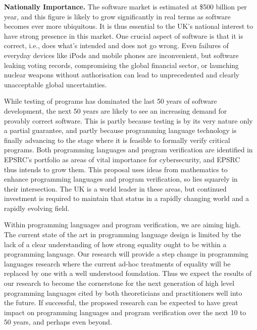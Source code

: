 \documentclass[a4paper,11pt]{article}
\begin{document}
\vspace*{0.02in}

{\bf Nationally Importance.} The software market is estimated at \$500
billion per year, and this figure is likely to grow 
significantly in real terms 
as software becomes ever more
ubiquitous. It is thus essential to the UK's national interest to have 
strong presence in this market. One crucial aspect of software is that
it is correct, i.e., does what's intended and does not go wrong.  Even
failures of everyday devices like iPods and mobile phones are
inconvenient,
but software leaking voting records,
compromising %
the global financial sector, or launching 
nuclear weapons without authorisation 
can lead to unprecedented and clearly unacceptable global uncertainties.

While testing of programs has dominated the last 50 years of software
development,
the next 50 years are likely to see an increasing
demand for provably correct software. This is partly because testing
is by its very nature only a partial guarantee, and partly because
programming language technology is finally advancing to the stage
where it is feasible to formally verify critical programs.
Both programming languages and program verification are identified in
EPSRC's portfolio as areas of vital 
importance for cybersecurity, and EPSRC
thus intends to grow them.
This proposal 
uses ideas from mathematics  to enhance 
programming languages and  program
verification, so lies squarely in their intersection. %
The UK is a world leader
in these areas, but continued investment is required to maintain that
status in a rapidly changing world and a rapidly evolving field.

Within programming languages and program verification, we are aiming
high.  The current state of the art in programming language design is
limited by the lack of a clear understanding of how strong equality
ought to be within a programming language. Our research will provide a
step change in programming languages research where the current
ad-hoc treatments of equality will be replaced by one with a well
understood foundation. Thus we expect the results of our research to
become the cornerstone for the next generation of high level
programming languages cited by both
theoreticians and practitioners well into the future. If successful, 
the proposed research can
be expected to have great impact on programming languages and program
verification over the next 10 to 50 years, and perhaps even beyond. 
\end{document}
